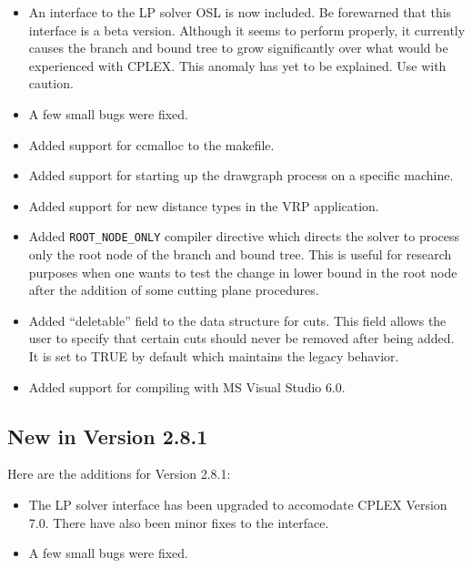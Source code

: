 \begin{itemize}

\item An interface to the LP solver OSL is now included. Be forewarned
that this interface is a beta version. Although it seems to perform
properly, it currently causes the branch and bound tree to grow
significantly over what would be experienced with CPLEX. This anomaly
has yet to be explained. Use with caution. 

\item A few small bugs were fixed.

\item Added support for ccmalloc to the makefile.

\item Added support for starting up the drawgraph process on a specific
machine. 

\item Added support for new distance types in the VRP application.

\item Added {\tt ROOT\_NODE\_ONLY} compiler directive which directs
the solver to process only the root node of the branch and bound tree.
This is useful for research purposes when one wants to test the change
in lower bound in the root node after the addition of some cutting
plane procedures.

\item Added ``deletable'' field to the data structure for cuts. This field
allows the user to specify that certain cuts should never be removed
after being added. It is set to TRUE by default which maintains the
legacy behavior.

\item Added support for compiling with MS Visual Studio 6.0.

\end{itemize}

\subsection{New in Version 2.8.1}

Here are the additions for Version 2.8.1:

\begin{itemize}

\item The LP solver interface has been upgraded to accomodate CPLEX
Version 7.0. There have also been minor fixes to the interface.

\item A few small bugs were fixed.

\end{itemize}

